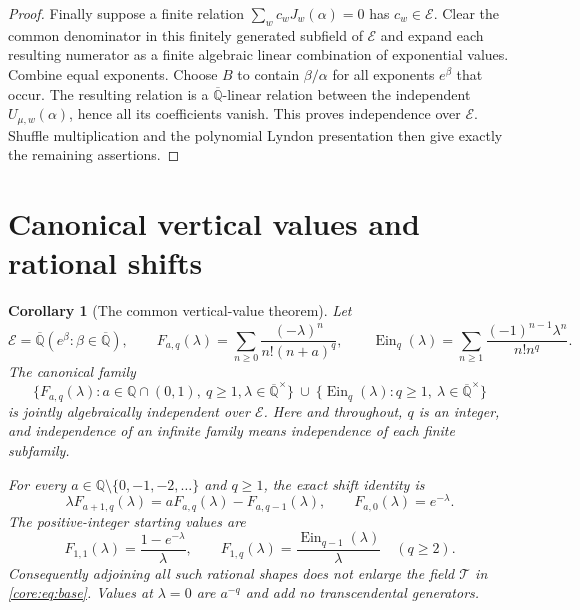 \documentclass[11pt,a4paper]{article}
\newcommand{\Qbar}{\overline{\mathbb Q}}
\newcommand{\E}{\mathcal E}
\newcommand{\T}{\mathcal T}
\DeclareMathOperator{\Ein}{Ein}
\newtheorem{corollary}[theorem]{Corollary}
\theoremstyle{definition}
\theoremstyle{remark}
\numberwithin{equation}{section}
\begin{document}
\begin{proof}
Finally suppose a finite relation $\sum_w c_wJ_w(\alpha)=0$ has
$c_w\in\E$. Clear the common denominator in this finitely generated
subfield of $\E$ and expand each resulting numerator as a finite
algebraic linear combination of exponential values. Combine equal
exponents. Choose $B$ to contain $\beta/\alpha$ for all exponents
$e^\beta$ that occur. The resulting relation is a $\Qbar$-linear
relation between the independent $U_{\mu,w}(\alpha)$, hence all
its coefficients vanish. This proves independence over $\E$.
Shuffle multiplication and the polynomial Lyndon presentation then
give exactly the remaining assertions.
\end{proof}

\section{Canonical vertical values and rational shifts}
\begin{corollary}[The common vertical-value theorem]\label{shared:vertical}
Let
\[
 \E=\Qbar(e^\beta:\beta\in\Qbar),\qquad
 F_{a,q}(\lambda)=\sum_{n\ge0}\frac{(-\lambda)^n}{n!(n+a)^q},
 \qquad
 \Ein_q(\lambda)=\sum_{n\ge1}
     \frac{(-1)^{n-1}\lambda^n}{n!n^q}.
\]
The canonical family
\[
 \{F_{a,q}(\lambda):a\in\mathbb Q\cap(0,1),\ q\ge1,
       \lambda\in\Qbar^\times\}
 \ \cup\ 
 \{\Ein_q(\lambda):q\ge1,\ \lambda\in\Qbar^\times\}
\]
is jointly algebraically independent over $\E$. Here and throughout,
$q$ is an integer, and independence of an infinite family means
independence of each finite subfamily.

For every $a\in\mathbb Q\setminus\{0,-1,-2,\ldots\}$ and $q\ge1$,
the exact shift identity is
\begin{equation}\label{core:eq:shape-shift}
 \lambda F_{a+1,q}(\lambda)
       =aF_{a,q}(\lambda)-F_{a,q-1}(\lambda),
 \qquad F_{a,0}(\lambda)=e^{-\lambda}.
\end{equation}
The positive-integer starting values are
\begin{equation}\label{core:eq:integer-shape}
 F_{1,1}(\lambda)=\frac{1-e^{-\lambda}}{\lambda},\qquad
 F_{1,q}(\lambda)=\frac{\Ein_{q-1}(\lambda)}{\lambda}\quad(q\ge2).
\end{equation}
Consequently adjoining all such rational shapes does not enlarge the
field $\T$ in \eqref{core:eq:base}. Values at $\lambda=0$ are $a^{-q}$
and add no transcendental generators.
\end{corollary}
\end{document}
